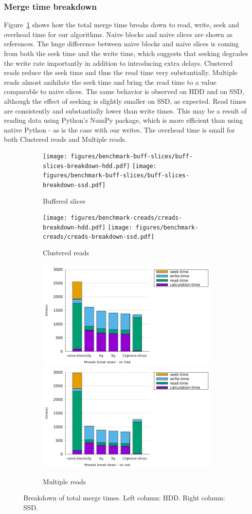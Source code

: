 \documentclass[10pt, conference, compsocconf]{IEEEtran}
\begin{document}
\subsubsection{Merge time breakdown}
Figure~\ref{fig:breakdowns-ssd} shows how the total merge time breaks
down to read, write, seek and overhead time for our algorithms. Naive
blocks and naive slices are shown as references. The huge difference
between naive blocks and naive slices is coming from both the seek
time and the write time, which suggests that seeking degrades the
write rate importantly in addition to introducing extra delays.
Clustered reads reduce the seek time and thus the read time very
substantially. Multiple reads almost anihilate the seek time and bring
the read time to a value comparable to naive slices.  The same
behavior is observed on HDD and on SSD, although the effect of seeking
is slightly smaller on SSD, as expected. Read times are consistently
and substantially lower than write times. This may be a result of
reading data using Python's NumPy package, which is more efficient
than using native Python - as is the case with our writes. The
overhead time is small for both Clustered reads and Multiple reads.
\begin{figure}
  \begin{subfigure}[b]{\columnwidth}
    \texttt{[image: figures/benchmark-buff-slices/buff-slices-breakdown-hdd.pdf]}
    \texttt{[image: figures/benchmark-buff-slices/buff-slices-breakdown-ssd.pdf]}
    \caption{Buffered slices}
  \end{subfigure}
  \begin{subfigure}[b]{\columnwidth}
    \texttt{[image: figures/benchmark-creads/creads-breakdown-hdd.pdf]}
    \texttt{[image: figures/benchmark-creads/creads-breakdown-ssd.pdf]}
    \caption{Clustered reads}
  \end{subfigure}
  \begin{subfigure}[b]{\columnwidth}
    \includegraphics[width=0.45\columnwidth]{figures/benchmark-mreads/mreads-breakdown-hdd.pdf}
    \includegraphics[width=0.45\columnwidth]{figures/benchmark-mreads/mreads-breakdown-ssd.pdf}
    \caption{Multiple reads}
  \end{subfigure}
  \caption{Breakdown of total merge times. Left column: HDD. Right column: SSD.}
  \label{fig:breakdowns-ssd}
\end{figure}
\end{document}
